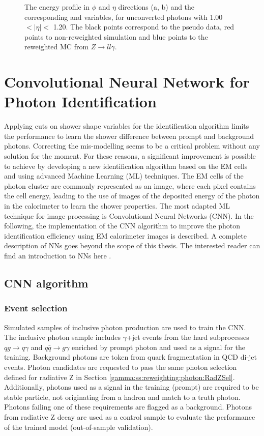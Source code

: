 \begin{figure}[htbp]
	\begin{tcolorbox}[colback=black!5!white,colframe=white!75!black]
    \caption{The energy profile in $\phi$ and $\eta$ directions (a, b) and the corresponding \Rphi and \Reta variables, for unconverted photons with 1.00 $ < |\eta| < $ 1.20. The black points correspond to the pseudo data, red points to non-reweighted simulation and blue points to the reweighted MC from $Z\rightarrow ll\gamma$.}
    \label{fig:gamma:ss:reweighting:photon:3dreweighting}
    \end{tcolorbox}
\end{figure}

\section{Convolutional Neural Network for Photon Identification}
\label{gamma:CNN}
Applying cuts on shower shape variables for the identification algorithm limits the performance to learn the shower difference between prompt and background photons. Correcting the mis-modelling seems to be a critical problem without any solution for the moment. For these reasons, a significant improvement is possible to achieve by developing a new identification algorithm based on the EM cells and using advanced Machine Learning (ML) techniques. The EM cells of the photon cluster are commonly represented as an image, where each pixel contains the cell energy, leading to the use of images of the deposited energy of the photon in the calorimeter to learn the shower properties. The most adapted ML technique for image processing is Convolutional Neural Networks (CNN). In the following, the implementation of the CNN algorithm to improve the photon identification efficiency using EM calorimeter images is described. A complete description of NNs goes beyond the scope of this thesis. The interested reader can find an introduction to NNs here \cite{NNs}. 

\subsection{CNN algorithm}
\subsubsection{Event selection}
Simulated samples of inclusive photon production are used to train the CNN. The inclusive photon sample includes $\gamma$+jet events from the hard subprocesses $qg \rightarrow q\gamma$ and $ q\bar{q}\rightarrow g\gamma$ enriched by prompt photon and used as a signal for the training. Background photons are token from quark fragmentation in QCD di-jet events. Photon candidates are requested to pass the same photon selection defined for radiative Z in Section \ref{gamma:ss:reweighting:photon:RadZSel}. Additionally, photons used as a signal in the training (prompt) are required to be stable particle, not originating from a hadron and match to a truth photon. Photons failing one of these requirements are flagged as a background. Photons from radiative Z decay are used as a control sample to evaluate the performance of the trained model (out-of-sample validation).

